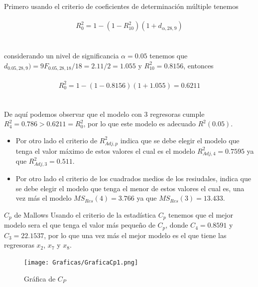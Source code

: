 \documentclass[11pt]{beamer}
\begin{document}
\begin{frame}
Primero usando el criterio de coeficientes  de determinación múltiple tenemos\\~\\

\[R^{2}_{0}=1-(1-R^{2}_{10})(1+d_{\alpha,28,9})\]\\~\\

considerando un nivel de significancia $\alpha=0.05$ tenemos que $d_{0.05,28,9})=9F_{0.05,28,18}/18=2.11/2=1.055$ y $R^{2}_{10}=0.8156$, entonces\\~\\

\[R^{2}_{0}=1-(1-0.8156)(1+1.055)=0.6211\]\\~\\

De aquí podemos observar que el modelo con 3 regresoras cumple $R^{2}_{4}=0.786>0.6211=R^{2}_{0}$, por lo que este modelo es adecuado $R^{2}(0.05).$

\end{frame}

\begin{frame}
\begin{itemize}
\justifying
\item[\textcolor{red}{\textbullet}] Por otro lado el criterio de $R^{2}_{Adj,p}$ indica que se debe elegir el modelo que tenga el valor máximo de estos valores el cual es el modelo $R^{2}_{Adj,4}=0.7595$ ya que $R^{2}_{Adj,3}=0.511$.

\item[\textcolor{red}{\textbullet}] Por otro lado el criterio de los cuadrados medios de los resiudales, indica que se debe elegir el modelo que tenga el menor de estos valores el cual es, una vez más el modelo $MS_{Res}(4)=3.766$ ya que $MS_{Res}(3)=13.433$.
\end{itemize}
\end{frame}

\begin{frame}{$C_{p}$ de Mallows}
Usando el criterio de la estadística $C_{p}$ tenemos que el mejor modelo sera el que tenga el valor más pequeño de $C_{p}$, donde $C_{4}=0.8591$ y $C_{3}=22.1537$, por lo que una vez más el mejor modelo es el que tiene las regresoras $x_{2}$, $x_{7}$ y $x_{8}$.

\begin{figure}[hbtp]
\centering
\texttt{[image: Graficas/GraficaCp1.png]}
\caption{Gráfica de $C_{P}$}
\end{figure}

\end{frame}
\end{document}
